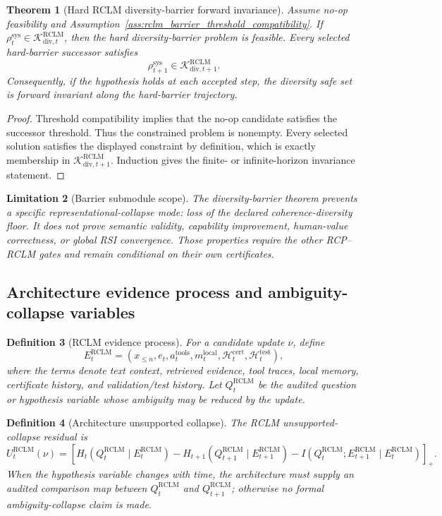 \documentclass[11pt,a4paper]{article}
\newtheorem{theorem}{Theorem}[section]
\newtheorem{definition}[theorem]{Definition}
\newtheorem{limitation}[theorem]{Limitation}
\newcommand{\Kcal}{\mathcal K}
\newcommand{\RCLM}{\mathrm{RCLM}}
\newcommand{\sys}{\mathrm{sys}}
\newcommand{\test}{\mathrm{test}}
\newcommand{\cert}{\mathrm{cert}}
\newcommand{\tools}{\mathrm{tools}}
\newcommand{\local}{\mathrm{local}}
\begin{document}
\begin{theorem}[Hard RCLM diversity-barrier forward invariance]
\label{thm:rclm_hard_diversity_forward_invariance}
Assume no-op feasibility and Assumption~\ref{ass:rclm_barrier_threshold_compatibility}.  If \(\rho_t^{\sys}\in\Kcal_{\mathrm{div},t}^{\RCLM}\), then the hard diversity-barrier problem is feasible.  Every selected hard-barrier successor satisfies
\[
\rho_{t+1}^{\sys}\in\Kcal_{\mathrm{div},t+1}^{\RCLM}.
\]
Consequently, if the hypothesis holds at each accepted step, the diversity safe set is forward invariant along the hard-barrier trajectory.
\end{theorem}

\begin{proof}
Threshold compatibility implies that the no-op candidate satisfies the successor threshold.  Thus the constrained problem is nonempty.  Every selected solution satisfies the displayed constraint by definition, which is exactly membership in \(\Kcal_{\mathrm{div},t+1}^{\RCLM}\).  Induction gives the finite- or infinite-horizon invariance statement.
\end{proof}

\begin{limitation}[Barrier submodule scope]
The diversity-barrier theorem prevents a specific representational-collapse mode: loss of the declared coherence-diversity floor.  It does not prove semantic validity, capability improvement, human-value correctness, or global RSI convergence.  Those properties require the other RCP--RCLM gates and remain conditional on their own certificates.
\end{limitation}

\subsection{Architecture evidence process and ambiguity-collapse variables}

\begin{definition}[RCLM evidence process]
For a candidate update \(\nu\), define
\[
E_t^{\RCLM}=(x_{\le n},e_t,a_t^{\tools},m_t^{\local},\mathcal H_t^{\cert},\mathcal H_t^{\test}),
\]
where the terms denote text context, retrieved evidence, tool traces, local memory, certificate history, and validation/test history. Let \(Q_t^{\RCLM}\) be the audited question or hypothesis variable whose ambiguity may be reduced by the update.
\end{definition}

\begin{definition}[Architecture unsupported collapse]
The RCLM unsupported-collapse residual is
\[
U_t^{\RCLM}(\nu)=
\left[
H_t(Q_t^{\RCLM}\mid E_t^{\RCLM})
-H_{t+1}(Q_{t+1}^{\RCLM}\mid E_{t+1}^{\RCLM})
-I(Q_t^{\RCLM};E_{t+1}^{\RCLM}\mid E_t^{\RCLM})
\right]_+.
\]
When the hypothesis variable changes with time, the architecture must supply an audited comparison map between \(Q_t^{\RCLM}\) and \(Q_{t+1}^{\RCLM}\); otherwise no formal ambiguity-collapse claim is made.
\end{definition}
\end{document}
